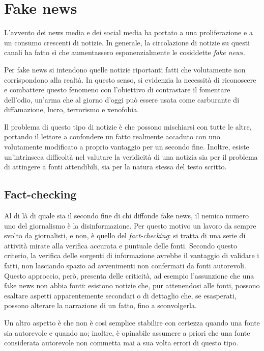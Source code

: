 \documentclass[12pt]{report}
\theoremstyle{definition}
\begin{document}
\section{Fake news} \label{fakenews}
L'avvento dei news media e dei social media ha portato a una proliferazione e a un consumo crescenti di notizie.
In generale, la circolazione di notizie su questi canali ha fatto sì che aumentassero esponenzialmente le cosiddette \textit{fake news}.

Per fake news si intendono quelle notizie riportanti fatti che volutamente non corrispondono alla realtà.
In questo senso, si evidenzia la necessità di riconoscere e combattere questo fenomeno con l'obiettivo di contrastare il fomentare dell'odio, un'arma che al giorno d'oggi può essere usata come carburante di diffamazione, lucro, terrorismo e xenofobia.

Il problema di questo tipo di notizie è che possono mischiarsi con tutte le altre, portando il lettore a confondere un fatto realmente accaduto con uno volutamente modificato a proprio vantaggio per un secondo fine.
Inoltre, esiste un'intrinseca difficoltà nel valutare la veridicità di una notizia sia per il problema di attingere a fonti attendibili, sia per la natura stessa del testo scritto.

\subsection{Fact-checking} \label{factchecking}
Al di là di quale sia il secondo fine di chi diffonde fake news, il nemico numero uno del giornalismo è la disinformazione.
Per questo motivo un lavoro da sempre svolto da giornalisti, e non, è quello del \textit{fact-checking}: si tratta di una serie di attività mirate alla verifica accurata e puntuale delle fonti.
Secondo questo criterio, la verifica delle sorgenti di informazione avrebbe il vantaggio di validare i fatti, non lasciando spazio ad avvenimenti non confermati da fonti autorevoli.
Questo approccio, però, presenta delle criticità, ad esempio l'assunzione che una fake news non abbia fonti: esistono notizie che, pur attenendosi alle fonti, possono esaltare aspetti apparentemente secondari o di dettaglio che, se esasperati, possono alterare la narrazione di un fatto, fino a sconvolgerla.

Un altro aspetto è che non è così semplice stabilire con certezza quando una fonte sia autorevole e quando no; inoltre, è opinabile assumere a priori che una fonte considerata autorevole non commetta mai a sua volta errori di questo tipo.
\end{document}
